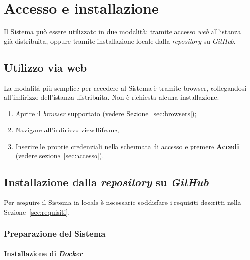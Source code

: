 \documentclass[10pt, letterpaper]{article}
\begin{document}
\section{Accesso e installazione}

Il Sistema può essere utilizzato in due modalità: tramite accesso \textit{web} all'istanza già distribuita, oppure tramite installazione locale dalla \textit{repository} su \textit{GitHub}.

\subsection{Utilizzo via web}
\label{sec:utilizzo-web}

La modalità più semplice per accedere al Sistema è tramite browser, collegandosi all'indirizzo dell'istanza distribuita.
Non è richiesta alcuna installazione.

\begin{enumerate}
    \item Aprire il \textit{browser} supportato (vedere Sezione~\ref{sec:browsers});
    \item Navigare all'indirizzo \href{https://view4life.me}{view4life.me};
    \item Inserire le proprie credenziali nella schermata di accesso e premere \textbf{Accedi} (vedere sezione~\ref{sec:accesso}).
\end{enumerate}

\subsection{Installazione dalla \textit{repository} su \textit{GitHub}}
\label{sec:installazione-github}

Per eseguire il Sistema in locale è necessario soddisfare i requisiti descritti nella Sezione~\ref{sec:requisiti}.

\subsubsection{Preparazione del Sistema}

\paragraph{Installazione di \textit{Docker}}
\end{document}
